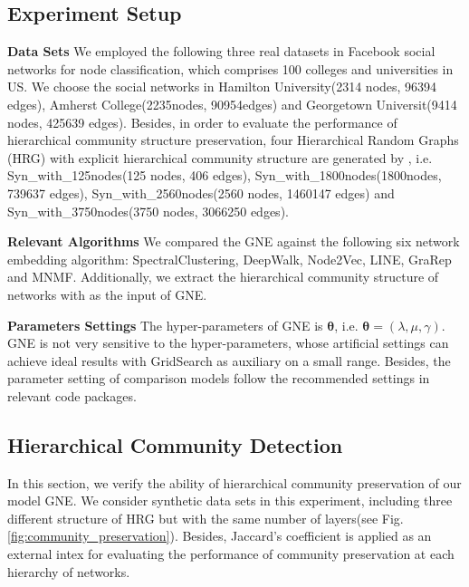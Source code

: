 \documentclass{article}
\theoremstyle{definition}
\begin{document}
	\subsection{Experiment Setup}

	\noindent \textbf{Data Sets} We employed the following three real datasets in Facebook social networks \cite{Traud2012Social} for node classification, which comprises 100 colleges and universities in US. We choose the social networks in Hamilton University(2314 nodes, 96394 edges), Amherst College(2235nodes, 90954edges) and Georgetown Universit(9414 nodes, 425639 edges). Besides, in order to evaluate the performance of hierarchical community structure preservation, four Hierarchical Random Graphs (HRG) with explicit hierarchical community structure are generated by \cite{clauset2008hierarchical}, i.e. Syn\_with\_125nodes(125 nodes, 406 edges), Syn\_with\_1800nodes(1800nodes, 739637 edges), Syn\_with\_2560nodes(2560 nodes, 1460147 edges) and Syn\_with\_3750nodes(3750 nodes, 3066250 edges).

	\noindent \textbf{Relevant Algorithms}
	We compared the GNE against the following six network embedding algorithm: SpectralClustering\cite{Tang2011Leveraging}, DeepWalk\cite{Perozzi2014DeepWalk}, Node2Vec\cite{Grover2016node2vec}, LINE\cite{Tang2015LINE}, GraRep\cite{Cao2015GraRep} and MNMF\cite{Wang2017Community}. Additionally, we extract the hierarchical community structure of networks with \cite{Tsvetovat2011Social} as the input of GNE.  

	\noindent \textbf{Parameters Settings} 
	The hyper-parameters of GNE is $\bm{\theta}$, i.e. $\bm{\theta}=(\lambda, \mu, \gamma)$. GNE is not very sensitive to the hyper-parameters, whose artificial settings can achieve ideal results with GridSearch as auxiliary on a small range. Besides, the parameter setting of comparison models follow the recommended settings in relevant code packages.

	\subsection{Hierarchical Community Detection}
	In this section, we verify the ability of hierarchical community preservation of our model GNE. We consider synthetic data sets in this experiment, including three different structure of HRG but with the same number of layers(see Fig.\ref{fig:community_preservation}). Besides, Jaccard's coefficient \cite{halkidi2001clustering} is applied as an external intex for evaluating the performance of community preservation at each hierarchy of networks.
\end{document}
